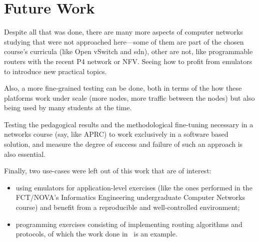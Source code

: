 \section{Future Work}

Despite all that was done, there are many more aspects of computer networks studying that were not approached here---some of them are part of the chosen course's curricula (like Open vSwitch and \gls{sdn}), other are not, like programmable routers with the recent P4 network or NFV.
Seeing how to profit from emulators to introduce new practical topics.

Also, a more fine-grained testing can be done, both in terms of the how these platforms work under scale (more nodes, more traffic between the nodes) but also being used by many students at the time.

Testing the pedagogical results and the methodological fine-tuning necessary in a networks course (say, like APRC) to work exclusively in a software based solution, and measure the degree of success and failure of such an approach is also essential.

Finally, two use-cases were left out of this work that are of interest:
\begin{itemize}
  \item using emulators for application-level exercises (like the ones performed in the FCT/NOVA's Informatics Engineering undergraduate Computer Networks course) and benefit from a reproducible and well-controlled environment;
  \item programming exercises consisting of implementing routing algorithms and protocols, of which the work done in~\cite{teachandlearnmininet} is an example.
\end{itemize}


